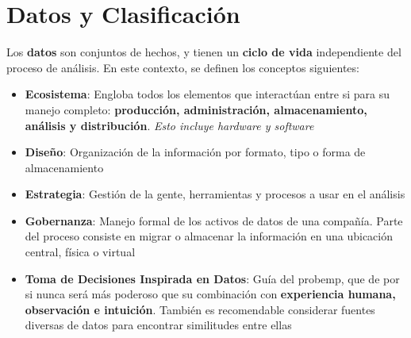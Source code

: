 \section{Datos y Clasificación}
Los \textbf{datos} son conjuntos de hechos, y tienen un \textbf{ciclo de vida} independiente del proceso de análisis. En este contexto, se definen los conceptos siguientes:

\begin{itemize}
    \item {\textbf{Ecosistema}: Engloba todos los elementos que interactúan entre si para su manejo completo: \textbf{producción, administración, almacenamiento, análisis y distribución}. \textit{Esto incluye hardware y software}}
    \item {\textbf{Diseño}: Organización de la información por formato, tipo o forma de almacenamiento}
    \item {\textbf{Estrategia}: Gestión de la gente, herramientas y procesos a usar en el análisis}
    \item {\textbf{Gobernanza}: Manejo formal de los activos de datos de una compañía. Parte del proceso consiste en migrar o almacenar la información en una ubicación central, física o virtual}
    \item {\textbf{Toma de Decisiones Inspirada en Datos}: Guía del \gls{probemp}, que de por si nunca será más poderoso que su combinación con \textbf{experiencia humana, observación e intuición}. También es recomendable considerar fuentes diversas de datos para encontrar similitudes entre ellas}    
\end{itemize} 

